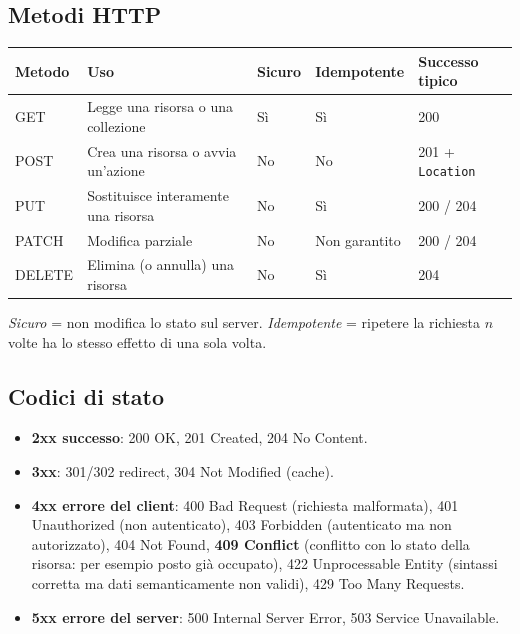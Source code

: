 \subsection{Metodi HTTP}
\begin{center}
\small
\begin{tabularx}{\textwidth}{@{}lXlll@{}}
\toprule
\textbf{Metodo} & \textbf{Uso} & \textbf{Sicuro} & \textbf{Idempotente} & \textbf{Successo tipico} \\
\midrule
GET & Legge una risorsa o una collezione & Sì & Sì & 200 \\
POST & Crea una risorsa o avvia un'azione & No & No & 201 + \texttt{Location} \\
PUT & Sostituisce interamente una risorsa & No & Sì & 200 / 204 \\
PATCH & Modifica parziale & No & Non garantito & 200 / 204 \\
DELETE & Elimina (o annulla) una risorsa & No & Sì & 204 \\
\bottomrule
\end{tabularx}
\end{center}
\emph{Sicuro} = non modifica lo stato sul server. \emph{Idempotente} = ripetere la richiesta $n$ volte ha lo stesso effetto di una sola volta.

\subsection{Codici di stato}
\begin{itemize}
    \item \textbf{2xx successo}: 200 OK, 201 Created, 204 No Content.
    \item \textbf{3xx}: 301/302 redirect, 304 Not Modified (cache).
    \item \textbf{4xx errore del client}: 400 Bad Request (richiesta malformata), 401 Unauthorized (non autenticato), 403 Forbidden (autenticato ma non autorizzato), 404 Not Found, \textbf{409 Conflict} (conflitto con lo stato della risorsa: per esempio posto già occupato), 422 Unprocessable Entity (sintassi corretta ma dati semanticamente non validi), 429 Too Many Requests.
    \item \textbf{5xx errore del server}: 500 Internal Server Error, 503 Service Unavailable.
\end{itemize}


